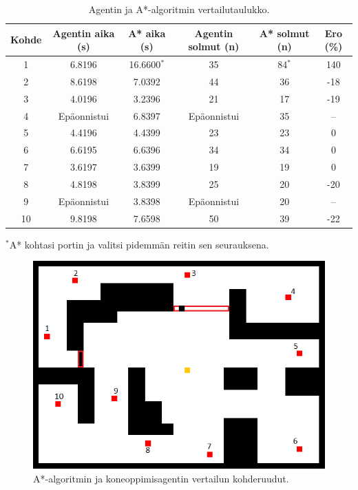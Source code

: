 \documentclass[utf8]{gradu3}
\begin{document}
\begin{table}[htp]
\centering
\caption{Agentin ja A*-algoritmin vertailutaulukko.}
\label{vertailutaulukko}
\begin{tabular}{cccccc}
\hline
Kohde & Agentin aika (s) & A* aika (s) & Agentin solmut (n) & A* solmut (n) & Ero (\%) \\
\hline \hline
1 & 6.8196 & 16.6600$^*$ & 35 & 84$^*$ & 140 \\

2 & 8.6198 & 7.0392 & 44 & 36 & -18 \\

3 & 4.0196 & 3.2396 & 21 & 17 & -19 \\

4 & Epäonnistui & 6.8397 & Epäonnistui & 35 & -- \\

5 & 4.4196 & 4.4399 & 23 & 23 & 0 \\

6 & 6.6195 & 6.6396 & 34 & 34 & 0 \\

7 & 3.6197 & 3.6399 & 19 & 19 & 0 \\

8 & 4.8198 & 3.8399 & 25 & 20 & -20 \\

9 & Epäonnistui & 3.8398 & Epäonnistui & 20 & -- \\

10 & 9.8198 & 7.6598 & 50 & 39 & -22 \\

\hline

\end{tabular}

$^*$A* kohtasi portin ja valitsi pidemmän reitin sen seurauksena.

\end{table}

\begin{figure}[h]
\centering
\includegraphics[width=12cm]{area_difficult_test_targets.png}
\caption{A*-algoritmin ja koneoppimisagentin vertailun kohderuudut.}
\label{testtargets}
\end{figure}
\end{document}
